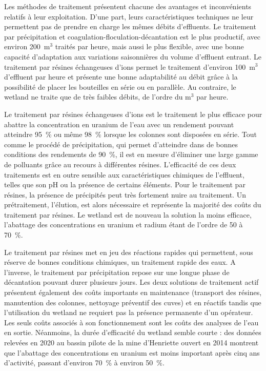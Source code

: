 \documentclass{article}
\begin{document}
Les méthodes de traitement présentent chacune des avantages et inconvénients relatifs à leur exploitation. D’une part, leurs caractéristiques techniques ne leur permettent pas de prendre en charge les mêmes débits d’effluents. Le traitement par précipitation et coagulation-floculation-décantation est le plus productif, avec environ 200~$\text{m}^3$ traités par heure, mais aussi le plus flexible, avec une bonne capacité d’adaptation aux variations saisonnières du volume d’effluent entrant. Le traitement par résines échangeuses d’ions permet le traitement d’environ 100~$\text{m}^3$ d’effluent par heure et présente une bonne adaptabilité au débit grâce à la possibilité de placer les bouteilles en série ou en parallèle. Au contraire, le wetland ne traite que de très faibles débits, de l’ordre du $\text{m}^3$ par heure.

Le traitement par résines échangeuses d’ions est le traitement le plus efficace pour abattre la concentration en uranium de l’eau avec un rendement pouvant atteindre 95~\% ou même 98~\% lorsque les colonnes sont disposées en série.  Tout comme le procédé de précipitation, qui permet d’atteindre dans de bonnes conditions des rendements de 90~\%, il est en mesure d’éliminer une large gamme de polluants grâce au recours à différentes résines. L’efficacité de ces deux traitements est en outre sensible aux caractéristiques chimiques de l’effluent, telles que son pH ou la présence de certains éléments. Pour le traitement par résines, la présence de précipités peut très fortement nuire au traitement. Un prétraitement, l’élution, est alors nécessaire et représente la majorité des coûts du traitement par résines. Le wetland est de nouveau la solution la moins efficace, l’abattage des concentrations en uranium et radium étant de l’ordre de 50 à 70~\%.

Le traitement par résines met en jeu des réactions rapides qui permettent, sous réserve de bonnes conditions chimiques, un traitement rapide des eaux. A l’inverse, le traitement par précipitation repose sur une longue phase de décantation pouvant durer plusieurs jours. Les deux solutions de traitement actif présentent également des coûts importants en maintenance (transport des résines, manutention des colonnes, nettoyage préventif des cuves) et en réactifs tandis que l’utilisation du wetland ne requiert pas la présence permanente d’un opérateur. Les seuls coûts associés à son fonctionnement sont les coûts des analyses de l’eau en sortie.  Néanmoins, la durée d’efficacité du wetland semble courte : des données relevées en 2020 au bassin pilote de la mine d’Henriette ouvert en 2014 montrent que l’abattage des concentrations en uranium est moins important après cinq ans d’activité, passant d'environ 70~\% à environ 50~\%. %
\end{document}
